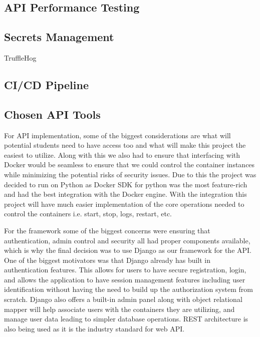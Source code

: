 \documentclass[12pt]{article}
\begin{document}
\subsection{API Performance Testing}

\subsection{Secrets Management}
TruffleHog

\subsection{CI/CD Pipeline}

\subsection{Chosen API Tools}
For API implementation, some of the biggest considerations are what will potential students need to have access too and what will make this project the easiest to utilize. Along with this we also had to ensure that interfacing with Docker would be seamless to ensure that we could control the container instances while minimizing the potential risks of security issues. Due to this the project was decided to run on Python as Docker SDK for python was the most feature-rich and had the best integration with the Docker engine. With the integration this project will have much easier implementation of the core operations needed to control the containers i.e. start, stop, logs, restart, etc.

For the framework some of the biggest concerns were ensuring that authentication, admin control and security all had proper components available, which is why the final decision was to use Django as our framework for the API. One of the biggest motivators was that Django already has built in authentication features. This allows for users to have secure registration, login, and allows the application to have session management features including user identification without having the need to build up the authorization system from scratch. Django also offers a built-in admin panel along with object relational mapper will help associate users with the containers they are utilizing, and manage user data leading to simpler database operations. REST architecture is also being used as it is the industry standard for web API.
\end{document}
